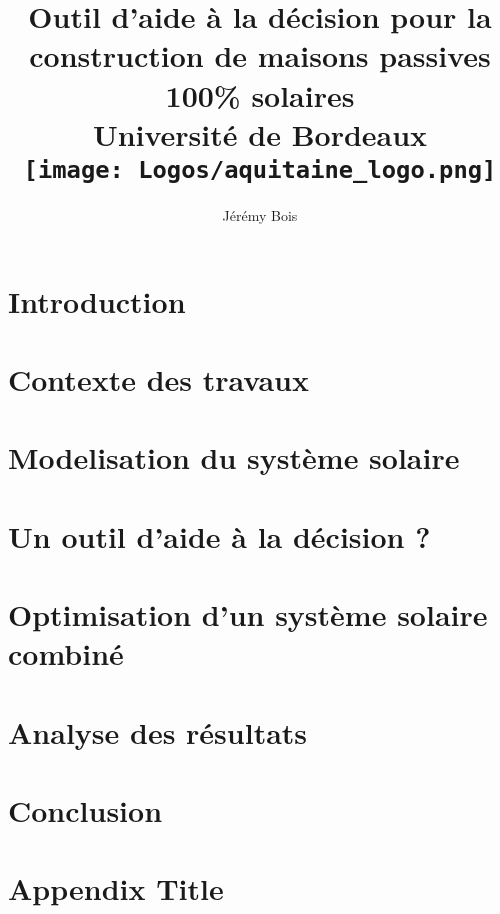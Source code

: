 \documentclass[12pt, twoside]{report}
\title{
    {Outil d’aide à la décision pour la construction de maisons passives 100\% solaires}\\
    {\large Université de Bordeaux}\\
    {\texttt{[image: Logos/aquitaine\_logo.png]}}
}
\author{Jérémy Bois}
\date{}
\begin{document}
\begin{titlepage}
    \maketitle
    \thispagestyle{empty}
\end{titlepage}





\tableofcontents
\listoffigures
\listoftables
\thispagestyle{empty}
\newpage


\chapter*{Introduction}


\chapter{Contexte des travaux}


\chapter{Modelisation du système solaire}


\chapter{Un outil d’aide à la décision ?}


\chapter{Optimisation d’un système solaire combiné}


\chapter{Analyse des résultats}


\chapter*{Conclusion}



\appendix
\chapter{Appendix Title}



\printbibliography
\end{document}

